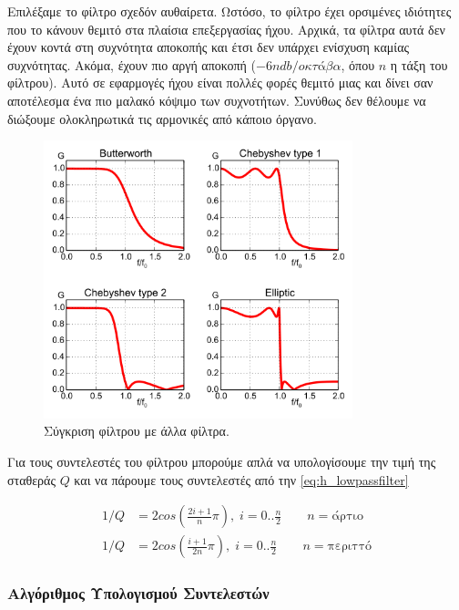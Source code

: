 \documentclass[12pt]{extarticle}
\begin{document}
Επιλέξαμε το φίλτρο  σχεδόν αυθαίρετα. Ωστόσο, το φίλτρο 
έχει ορσιμένες ιδιότητες που το κάνουν θεμιτό στα πλαίσια επεξεργασίας ήχου.
Αρχικά, τα φίλτρα αυτά δεν έχουν  κοντά στη συχνότητα αποκοπής 
και έτσι δεν υπάρχει ενίσχυση καμίας συχνότητας. Ακόμα, 
έχουν πιο αργή αποκοπή ($-6n db/οκτάβα$, όπου $n$ η τάξη του φίλτρου). 
Αυτό σε εφαρμογές ήχου είναι πολλές φορές θεμιτό μιας και δίνει σαν αποτέλεσμα ένα πιο μαλακό 
κόψιμο των συχνοτήτων. Συνύθως δεν θέλουμε να διώξουμε ολοκληρωτικά τις αρμονικές 
από κάποιο όργανο.

\begin{figure}[!htb]
    \centering
    \includegraphics[width=0.8\textwidth]{./assets/comparison_filters.png}
    \caption{Σύγκριση φίλτρου  με άλλα φίλτρα.}
    \label{fig:}
\end{figure}

Για τους συντελεστές του φίλτρου  μπορούμε απλά να υπολογίσουμε την τιμή 
της σταθεράς $Q$ και να πάρουμε τους συντελεστές από την \cref{eq:h_lowpassfilter} \cite{OpenheimAlan, JuceDocumentation}

\begin{align}
    1/Q &= {2cos(\frac{2i + 1}{n}\pi)}, \; i = 0..\frac{n}{2} \qquad n = {\text{άρτιο}} \\ 
    1/Q &= {2cos(\frac{i + 1}{2n}\pi)}, \; i = 0..\frac{n}{2} \qquad n = {\text{περιττό}}
\end{align}

\subsubsection{Αλγόριθμος Υπολογισμού Συντελεστών}
\end{document}
